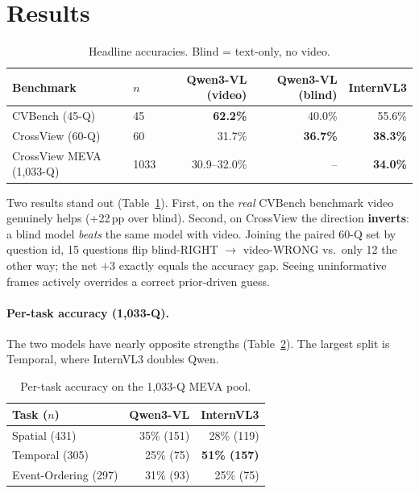 \documentclass[11pt]{article}
\begin{document}
\section{Results}

\begin{table}[h]
\centering
\caption{Headline accuracies. Blind = text-only, no video.}
\label{tab:headline}
\begin{tabular}{llrrr}
\toprule
Benchmark & $n$ & Qwen3-VL (video) & Qwen3-VL (blind) & InternVL3 \\
\midrule
CVBench (45-Q)          & 45   & \textbf{62.2\%} & 40.0\% & 55.6\% \\
CrossView (60-Q)        & 60   & 31.7\%          & \textbf{36.7\%} & \textbf{38.3\%} \\
CrossView MEVA (1,033-Q)& 1033 & 30.9--32.0\%    & --     & \textbf{34.0\%} \\
\bottomrule
\end{tabular}
\end{table}

Two results stand out (Table~\ref{tab:headline}). First, on the \emph{real} CVBench benchmark video
genuinely helps (+22\,pp over blind). Second, on CrossView the direction \textbf{inverts}: a blind
model \emph{beats} the same model with video. Joining the paired 60-Q set by question id, 15
questions flip blind-RIGHT $\rightarrow$ video-WRONG vs.\ only 12 the other way; the net $+3$ exactly
equals the accuracy gap. Seeing uninformative frames actively overrides a correct prior-driven guess.

\paragraph{Per-task accuracy (1,033-Q).} The two models have nearly opposite strengths
(Table~\ref{tab:pertask}). The largest split is Temporal, where InternVL3 doubles Qwen.

\begin{table}[h]
\centering
\caption{Per-task accuracy on the 1,033-Q MEVA pool.}
\label{tab:pertask}
\begin{tabular}{lrr}
\toprule
Task ($n$) & Qwen3-VL & InternVL3 \\
\midrule
Spatial (431)        & 35\% (151) & 28\% (119) \\
Temporal (305)       & 25\% (75)  & \textbf{51\% (157)} \\
Event-Ordering (297) & 31\% (93)  & 25\% (75) \\
\bottomrule
\end{tabular}
\end{table}
\end{document}
